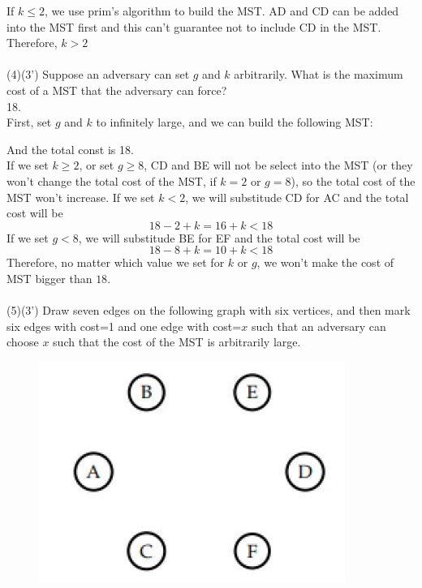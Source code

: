 \documentclass[10.5pt]{article}
\begin{document}
If $k \le 2$, we use prim's algorithm to build the MST. AD and CD can be added into the MST first and this can't guarantee not to include CD in the MST.\\
Therefore, $k > 2$\\
\\
(4)(3') Suppose an adversary can set $g$ and $k$ arbitrarily. What is the maximum cost of a MST that the adversary can force?\\
18.\\
First, set $g$ and $k$ to infinitely large, and we can build the following MST:\\
\begin{center}
\end{center}
And the total const is 18.\\
If we set $k \ge 2$, or set $g \ge 8$, CD and BE will not be select into the MST (or they won't change the total cost of the MST, if $k = 2$ or $g = 8$), so the total cost of the MST won't increase.
If we set $k < 2$, we will substitude CD for AC and the total cost will be
$$
	18 - 2 + k = 16 + k < 18
$$
If we set  $g < 8$, we will substitude BE for EF and the total cost will be
$$
	18 - 8 + k = 10 + k < 18
$$
Therefore, no matter which value we set for $k$ or $g$, we won't make the cost of MST bigger than $18$.\\
\\
(5)(3') Draw seven edges on the following graph with six vertices, and then mark six edges with cost=1 and one edge with cost=$x$ such that an adversary can choose $x$ such that the cost of the MST is arbitrarily large.
\begin{figure}[h]
	\centering
	\includegraphics[width=0.3\linewidth]{3-5}
\end{figure}
\end{document}
